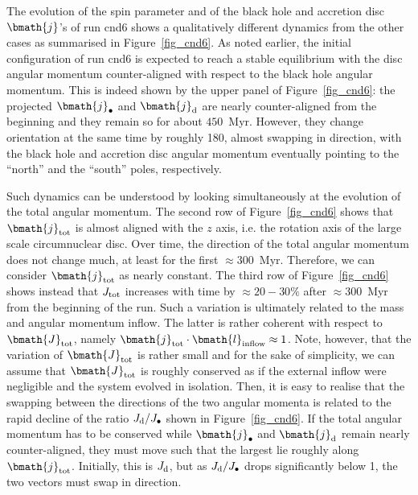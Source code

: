 \documentclass[a4paper,fleqn,usenatbib]{mnras}
\begin{document}
The evolution of the spin parameter and of the black hole and accretion disc $\bmath{j}$'s of run cnd6 shows a qualitatively different dynamics from the other cases as summarised in Figure~\ref{fig_cnd6}.
As noted earlier, the initial configuration of run cnd6 is expected to reach a stable equilibrium with the disc angular momentum counter-aligned with respect to the black hole angular momentum.
This is indeed shown by the upper panel of Figure~\ref{fig_cnd6}: the projected $\bmath{j}_{\bullet}$ and $\bmath{j}_{\rm d}$ are nearly counter-aligned from the beginning and they remain so for about $450$~Myr. 
However, they change orientation at the same time by roughly 180\degr, almost swapping in direction, with the black hole and accretion disc angular momentum eventually pointing to the ``north'' and the ``south'' poles, respectively. 

Such dynamics can be understood by looking simultaneously at the evolution of the total angular momentum.
The second row of Figure~\ref{fig_cnd6} shows that $\bmath{j}_{\rm tot}$ is almost aligned with the $z$ axis, i.e. the rotation axis of the large scale circumnuclear disc.
Over time, the direction of the total angular momentum does not change much, at least for the first $\approx 300$~Myr.
Therefore, we can consider $\bmath{j}_{\rm tot}$ as nearly constant.
The third row of Figure~\ref{fig_cnd6} shows instead that $J_{\rm tot}$ increases with time by $\approx 20-30\%$ after $\approx 300$~Myr from the beginning of the run.
Such a variation is ultimately related to the mass and angular momentum inflow. 
The latter is rather coherent with respect to $\bmath{J}_{\rm tot}$, namely $\bmath{j}_{\rm tot} \cdot \bmath{l}_{\rm inflow} \approx 1$.
Note, however, that the variation of $\bmath{J}_{\rm tot}$ is rather small and for the sake of simplicity, we can assume that $\bmath{J}_{\rm tot}$ is roughly conserved as if the external inflow were negligible and the system evolved in isolation.
Then, it is easy to realise that the swapping between the directions of the two angular momenta is related to the rapid decline of the ratio $J_{\rm d}/J_{\bullet}$ shown in Figure~\ref{fig_cnd6}.
If the total angular momentum has to be conserved while $\bmath{j}_{\bullet}$ and $\bmath{j}_{\rm d}$ remain nearly counter-aligned, they must move such that the largest lie roughly along $\bmath{j}_{\rm tot}$.
Initially, this is $J_{\rm d}$, but as $J_{\rm d}/J_{\bullet}$ drops significantly below 1, the two vectors must swap in direction.
\end{document}
